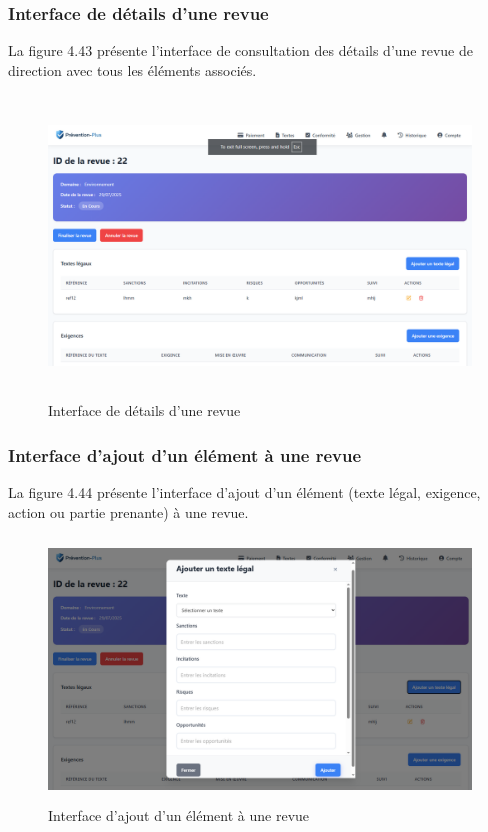 \subsubsection{Interface de détails d'une revue}
\noindent La figure 4.43 présente l'interface de consultation des détails d'une revue de direction avec tous les éléments associés.

\begin{figure}[H]
    \centering 
    \includegraphics[width=13cm,height=8cm]{images/revuedetails.PNG}
    \caption{Interface de détails d'une revue}
\end{figure}

\subsubsection{Interface d'ajout d'un élément à une revue}
\noindent La figure 4.44 présente l'interface d'ajout d'un élément (texte légal, exigence, action ou partie prenante) à une revue.

\begin{figure}[H]
    \centering
    \includegraphics[width=13cm,height=7cm]{images/addelementmodal.PNG}
    \caption{Interface d'ajout d'un élément à une revue}
\end{figure}

